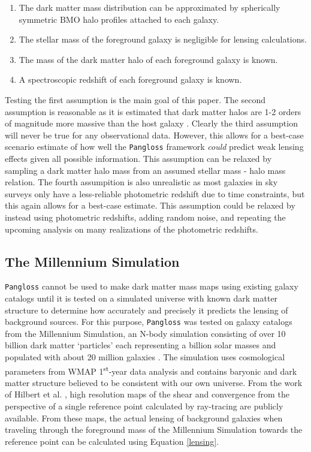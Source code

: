 \documentclass[%
 reprint,
 amsmath,amssymb,
 aps,nofootinbib
]{revtex4-1}
\begin{document}
\begin{enumerate}
\item The dark matter mass distribution can be approximated by spherically symmetric BMO halo profiles attached to each galaxy.
\item The stellar mass of the foreground galaxy is negligible for lensing calculations.
\item The mass of the dark matter halo of each foreground galaxy is known.
\item A spectroscopic redshift of each foreground galaxy is known.
\end{enumerate}

Testing the first assumption is the main goal of this paper. The second assumption is reasonable as it is estimated that dark matter halos are 1-2 orders of magnitude more massive than the host galaxy \cite{smhr}. Clearly the third assumption will never be true for any observational data. However, this allows for a best-case scenario estimate of how well the \texttt{Pangloss} framework \textit{could} predict weak lensing effects given all possible information. This assumption can be relaxed by sampling a dark matter halo mass from an assumed stellar mass - halo mass relation. The fourth assumpition is also unrealistic as most galaxies in sky surveys only have a less-reliable photometric redshift due to time constraints, but this again allows for a best-case estimate. This assumption could be relaxed by instead using photometric redshifts, adding random noise, and repeating the upcoming analysis on many realizations of the photometric redshifts.

\subsection*{The Millennium Simulation}
\texttt{Pangloss} cannot be used to make dark matter mass maps using existing galaxy catalogs until it is tested on a simulated universe with known dark matter structure to determine how accurately and precisely it predicts the lensing of background sources. For this purpose, \texttt{Pangloss} was tested on galaxy catalogs from the Millennium Simulation, an N-body simulation consisting of over 10 billion dark matter `particles' each representing a billion solar masses and populated with about 20 million galaxies \cite{millennium_simulation}. The simulation uses cosmological parameters from WMAP 1\textsuperscript{st}-year data analysis and contains baryonic and dark matter structure believed to be consistent with our own universe. From the work of Hilbert et al. \cite{ray_tracing}, high resolution maps of the shear and convergence from the perspective of a single reference point calculated by ray-tracing are publicly available. From these maps, the actual lensing of background galaxies when traveling through the foreground mass of the Millennium Simulation towards the reference point can be calculated using Equation \eqref{lensing}.
\end{document}
